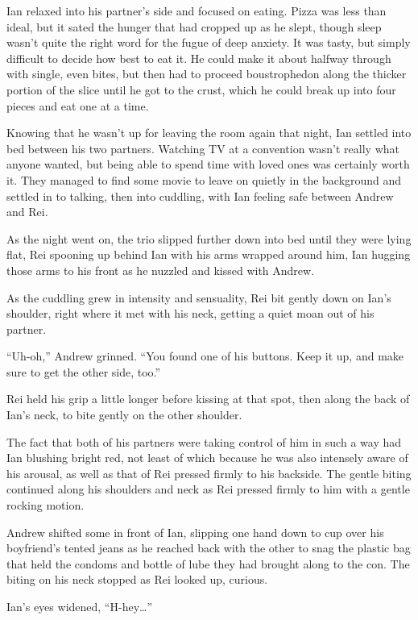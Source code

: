Ian relaxed into his partner's side and focused on eating. Pizza was less than ideal, but it sated the hunger that had cropped up as he slept, though sleep wasn't quite the right word for the fugue of deep anxiety.  It was tasty, but simply difficult to decide how best to eat it. He could make it about halfway through with single, even bites, but then had to proceed boustrophedon along the thicker portion of the slice until he got to the crust, which he could break up into four pieces and eat one at a time.

Knowing that he wasn't up for leaving the room again that night, Ian settled into bed between his two partners. Watching TV at a convention wasn't really what anyone wanted, but being able to spend time with loved ones was certainly worth it. They managed to find some movie to leave on quietly in the background and settled in to talking, then into cuddling, with Ian feeling safe between Andrew and Rei.

As the night went on, the trio slipped further down into bed until they were lying flat, Rei spooning up behind Ian with his arms wrapped around him, Ian hugging those arms to his front as he nuzzled and kissed with Andrew.

As the cuddling grew in intensity and sensuality, Rei bit gently down on Ian's shoulder, right where it met with his neck, getting a quiet moan out of his partner.

``Uh-oh,'' Andrew grinned. ``You found one of his buttons. Keep it up, and make sure to get the other side, too.''

Rei held his grip a little longer before kissing at that spot, then along the back of Ian's neck, to bite gently on the other shoulder.

The fact that both of his partners were taking control of him in such a way had Ian blushing bright red, not least of which because he was also intensely aware of his arousal, as well as that of Rei pressed firmly to his backside. The gentle biting continued along his shoulders and neck as Rei pressed firmly to him with a gentle rocking motion.

Andrew shifted some in front of Ian, slipping one hand down to cup over his boyfriend's tented jeans as he reached back with the other to snag the plastic bag that held the condoms and bottle of lube they had brought along to the con. The biting on his neck stopped as Rei looked up, curious.

Ian's eyes widened, ``H-hey\ldots{}''

